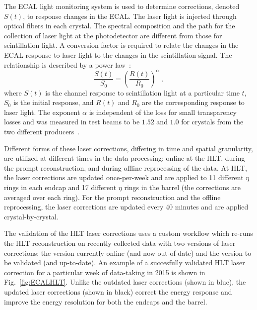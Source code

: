 The ECAL light monitoring system is used to determine corrections,
denoted $S(t)$, to response changes in the ECAL. The
laser light is injected through optical fibers in each crystal. The spectral
composition and the path for the collection of laser light at the
photodetector are different from those for scintillation light. A
conversion factor is required to relate the changes in the ECAL
response to laser light to the changes in the scintillation
signal. The relationship is described by a power law~\cite{CMSECALTDR}:
\begin{equation}
\frac{S(t)}{S_0} = \left(\frac{R(t)}{R_0}\right)^{\alpha}~,
\end{equation}
where $S(t)$ is the channel response to scintillation light at a particular time $t$, $S_0$ is the initial
response, and $R(t)$ and $R_0$ are the corresponding response to laser
light. The exponent $\alpha$ is independent of the loss for small
transparency losses and was measured in test beams to be $1.52$ and
$1.0$ for crystals from the two different
producers~\cite{VanLysebetten:787485,Adzic:2006za,Ghezzi:934066}.

Different forms of these laser corrections, differing in time and
spatial granularity, are utilized at different
times in the data processing: online at the HLT, during the prompt
reconstruction, and during offline reprocessing of the data. At HLT,
the laser corrections are updated once-per-week and are applied to 11
different $\eta$ rings in each endcap and 17 different $\eta$ rings in
the barrel (the corrections are averaged over each ring). For the prompt reconstruction and the offline
reprocessing, the laser corrections are updated every 40 minutes
and are applied crystal-by-crystal.

The validation of the HLT laser corrections uses a custom workflow which
re-runs the HLT reconstruction on recently collected data with two versions of
laser corrections: the version currently online (and now out-of-date)
and the version to be validated (and up-to-date). An example of a
succesfully validated HLT laser correction for a particular week of
data-taking in 2015 is shown in Fig.~\ref{fig:ECALHLT}. Unlike the
outdated laser corrections (shown in blue), the updated
laser corrections (shown in black) correct the energy response and
improve the energy resolution for both the endcaps and the barrel.

